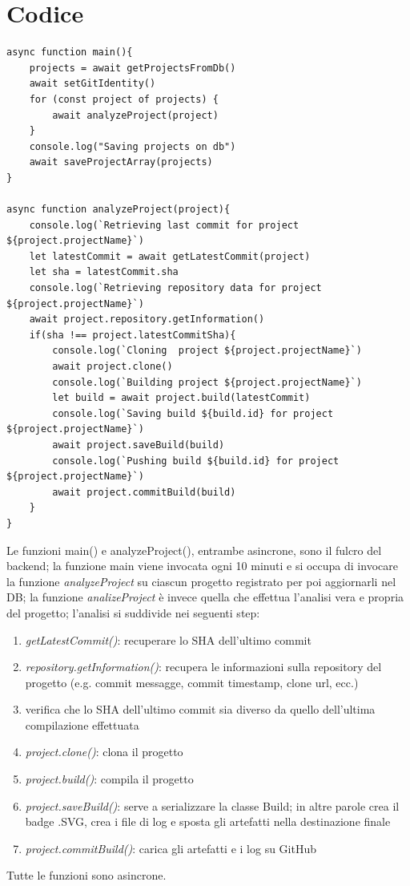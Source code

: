 \documentclass{report}
\begin{document}
\section{Codice}
\begin{lstlisting}
async function main(){
    projects = await getProjectsFromDb()
    await setGitIdentity()
    for (const project of projects) {
        await analyzeProject(project)
    }
    console.log("Saving projects on db")
    await saveProjectArray(projects)
}

async function analyzeProject(project){
    console.log(`Retrieving last commit for project ${project.projectName}`)
    let latestCommit = await getLatestCommit(project)
    let sha = latestCommit.sha
    console.log(`Retrieving repository data for project ${project.projectName}`)
    await project.repository.getInformation()
    if(sha !== project.latestCommitSha){
        console.log(`Cloning  project ${project.projectName}`)
        await project.clone()
        console.log(`Building project ${project.projectName}`)
        let build = await project.build(latestCommit)
        console.log(`Saving build ${build.id} for project ${project.projectName}`)
        await project.saveBuild(build)
        console.log(`Pushing build ${build.id} for project ${project.projectName}`)
        await project.commitBuild(build)
    }
}
\end{lstlisting}
Le funzioni main() e analyzeProject(), entrambe asincrone, sono il fulcro del backend; la funzione main viene invocata ogni 10 minuti e si occupa di invocare la funzione \textit{analyzeProject} su ciascun progetto registrato per poi aggiornarli nel DB; la funzione \textit{analizeProject} è invece quella che effettua l'analisi vera e propria del progetto; l'analisi si suddivide nei seguenti step:
\begin{enumerate}
\item \textit{getLatestCommit()}: recuperare lo SHA dell'ultimo commit
\item \textit{repository.getInformation()}: recupera le informazioni sulla repository del progetto (e.g. commit messagge, commit timestamp, clone url, ecc.)
\item verifica che lo SHA dell'ultimo commit sia diverso da quello dell'ultima compilazione effettuata
\item \textit{project.clone()}: clona il progetto
\item \textit{project.build()}: compila il progetto
\item \textit{project.saveBuild()}: serve a serializzare la classe Build; in altre parole crea il badge .SVG, crea i file di log e sposta gli artefatti nella destinazione finale
\item \textit{project.commitBuild()}: carica gli artefatti e i log su GitHub
\end{enumerate}
Tutte le funzioni sono asincrone.
\end{document}

